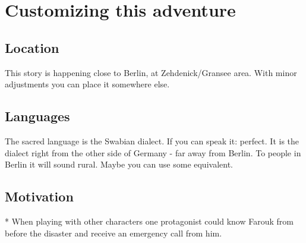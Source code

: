 \section{Customizing this adventure}

\subsection{Location}
This story is happening close to Berlin, at Zehdenick/Gransee area. With minor adjustments you can place it somewhere else.

\subsection{Languages}
The sacred language is the Swabian dialect. If you can speak it: perfect. It is the dialect right from the other side of Germany - far away from Berlin. To people in Berlin it will sound rural. Maybe you can use some equivalent.

\subsection{Motivation}

* When playing with other characters one protagonist could know Farouk from before the disaster and receive an emergency call from him.
